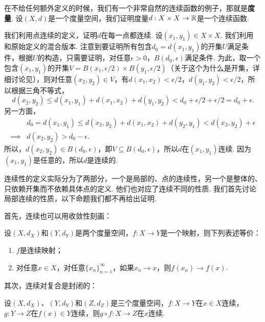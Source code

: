 \begin{example}
在不给任何额外定义的时候，我们有一个非常自然的连续函数的例子，那就是\textbf{度量}. 设$(X,d)$是一个度量空间，我们证明度量$d:X\times X\to\mathbb{R}$是一个连续函数. 

我们利用点连续的定义，证明$d$在每一点都连续. 设$(x_1,y_1)\in X\times X$. 我们利用 和原始定义的混合版本. 注意到要证明所有包含$d_0=d(x_1,y_1)$的开集$U$满足条件，根据$U$的构造，只需要证明，对任意$\epsilon>0$，$B(d_0,\epsilon)$满足条件. 为此，取一个包含$(x_1,y_1)$的开集$V=B(x_1,\epsilon/2)\times B(y_1,\epsilon/2)$（关于这个为什么是开集，详细讨论见），则对任意$(x_2,y_2)\in V$，有$d(x_1,x_2)<\epsilon/2$，$d(y_1,y_2)<\epsilon/2$，所以根据三角不等式，
\[d(x_2,y_2)\leq d(x_1,y_1)+d(x_1,x_2)+d(y_1,y_2)<d_0+\epsilon/2+\epsilon/2=d_0+\epsilon.\]
另一方面，
\begin{align*}
    &d_0=d(x_1,y_1)\leq d(x_2,y_2)+d(x_1,x_2)+d(y_2,y_1)<d(x_2,y_2)+\epsilon\\
\implies& d(x_2,y_2)>d_0-\epsilon.
\end{align*}
所以，$d(x_2,y_2)\in B(d_0,\epsilon)$，即$V\subseteq B(d_0,\epsilon)$，所以$d$在$(x_1,y_1)$连续. 因为$(x_1,y_1)$是任意的，所以$d$是连续的.
\end{example}

连续性的定义实际分为了两部分，一个是局部的、点的连续性，另一个是整体的、只依赖开集而不依赖具体点的定义. 他们也对应了连续不同的性质. 我们首先讨论局部连续的性质，以下命题我们都不再给出证明. 

首先，连续也可以用收敛性刻画：

\begin{proposition}\label{prop:continuous-converge}
    设$(X,d_X)$和$(Y,d_Y)$是两个度量空间，$f:X\to Y$是一个映射，则下列表述等价：
    \begin{enumerate}
        \item $f$是连续映射；
        \item 对任意$x\in X$，对任意$\{x_n\}_{n=1}^\infty$，如果$x_n\to x$，则$f(x_n)\to f(x)$.
    \end{enumerate}
\end{proposition}

其次，连续对复合是封闭的：
\begin{proposition}\label{prop:continuous-composition}
    设$(X,d_X)$、$(Y,d_Y)$和$(Z,d_Z)$是三个度量空间，$f:X\to Y$在$x\in X$连续，$g:Y\to Z$在$f(x)\in Y$连续，则$g\circ f:X\to Z$在$x$连续. 
\end{proposition}

